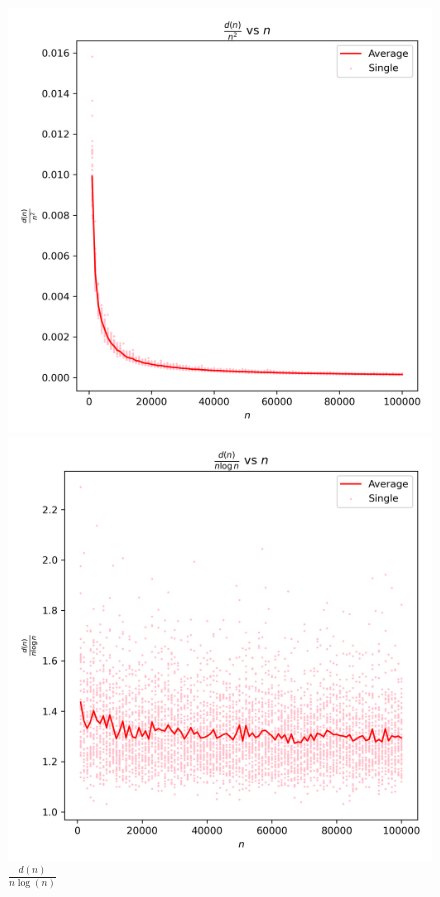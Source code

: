 \documentclass{article}
\begin{document}
\begin{figure}[H]
\begin{minipage}{0.24\textwidth}
        \caption{$\frac{d(n)}{n}$}
    \end{minipage}
    \begin{minipage}{0.24\textwidth}
        \centering
        \includegraphics[width=\linewidth]{graphs/d_factor_over_n_squared_vs_n.png}
        \caption{$\frac{d(n)}{n^2}$}
    \end{minipage}
    \begin{minipage}{0.24\textwidth}
        \centering
        \includegraphics[width=\linewidth]{graphs/d_factor_over_n_log_n_vs_n.png}
        \caption{$\frac{d(n)}{n \log(n)}$}
    \end{minipage}
\end{figure}
\end{document}
